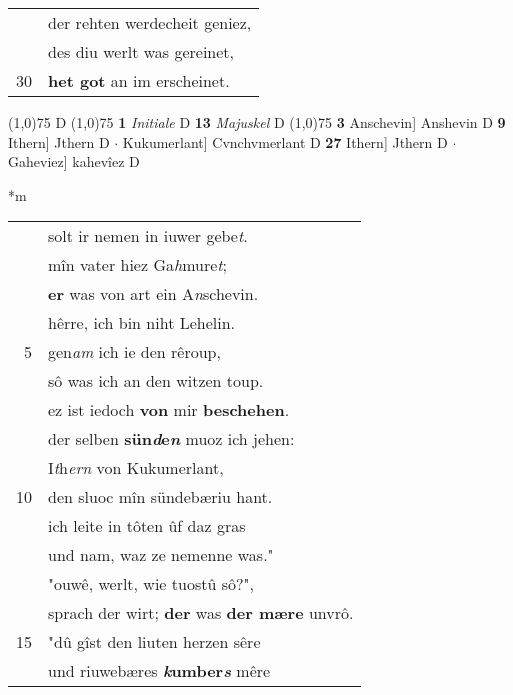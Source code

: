 \documentclass[8pt,a4paper,notitlepage]{article}
\begin{document}
\begin{table}[ht]
\begin{minipage}[t]{0.5\linewidth}
\begin{tabular}{rl}
 & der rehten werdecheit geniez,\\ 
 & des diu werlt was gereinet,\\ 
30 & \textbf{het got} an im erscheinet.\\ 
\end{tabular}
\scriptsize
\line(1,0){75} \newline
D \newline
\line(1,0){75} \newline
\textbf{1} \textit{Initiale} D  \textbf{13} \textit{Majuskel} D  \newline
\line(1,0){75} \newline
\textbf{3} Anschevin] Anshevin D \textbf{9} Ithern] Jthern D  $\cdot$ Kukumerlant] Cvnchvmerlant D \textbf{27} Ithern] Jthern D  $\cdot$ Gaheviez] kahevîez D \newline
\end{minipage}
\hspace{0.5cm}
\begin{minipage}[t]{0.5\linewidth}
\small
\begin{center}*m
\end{center}
\begin{tabular}{rl}
 & solt ir  nemen in iuwer gebe\textit{t}.\\ 
 & mîn vater hiez Ga\textit{h}mure\textit{t};\\ 
 & \textbf{er} was von art ein A\textit{n}schevin.\\ 
 & hêrre, ich bin niht Lehelin.\\ 
5 & gen\textit{am} ich ie den rêroup,\\ 
 & sô was ich an den witzen toup.\\ 
 & ez ist iedoch \textbf{von} mir \textbf{beschehen}.\\ 
 & der selben \textbf{sün\textit{d}e\textit{n}} muoz ich jehen:\\ 
 & I\textit{t}h\textit{ern} von Kukumerlant,\\ 
10 & den sluoc mîn sündebæriu hant.\\ 
 & ich leite in tôten ûf daz gras\\ 
 & und nam, waz ze nemenne was."\\ 
 & "ouwê, werlt, wie tuostû sô?",\\ 
 & sprach der wirt; \textbf{der} was \textbf{der mære} unvrô.\\ 
15 & "dû gîst den liuten herzen sêre\\ 
 & und riuwebæres \textbf{\textit{k}umber\textit{s}} mêre\\ 

\end{tabular}
\end{minipage}
\end{table}
\end{document}
